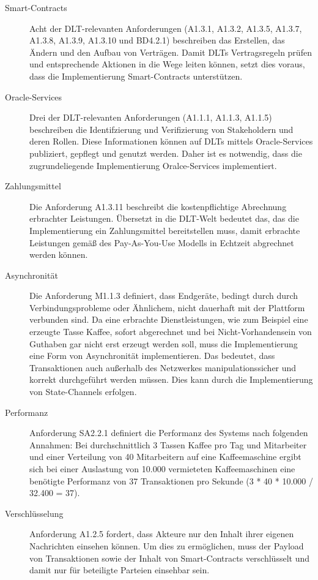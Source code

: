 \begin{description}
  \item[Smart-Contracts] Acht der \ac{DLT}-relevanten Anforderungen (A1.3.1, A1.3.2, A1.3.5, A1.3.7, A1.3.8, A1.3.9, A1.3.10 und BD4.2.1) beschreiben das Erstellen, das Ändern und den Aufbau von Verträgen. Damit \ac{DLT}s Vertragsregeln prüfen und entsprechende Aktionen in die Wege leiten können, setzt dies voraus, dass die Implementierung Smart-Contracts unterstützen.
  \item[Oracle-Services] Drei der \ac{DLT}-relevanten Anforderungen (A1.1.1, A1.1.3, A1.1.5) beschreiben die Identifzierung und Verifizierung von Stakeholdern und deren Rollen. Diese Informationen können auf \ac{DLT}s mittels Oracle-Services publiziert, gepflegt und genutzt werden. Daher ist es notwendig, dass die zugrundeliegende Implementierung Oralce-Services implementiert.
  \item[Zahlungsmittel] Die Anforderung A1.3.11 beschreibt die kostenpflichtige Abrechnung erbrachter Leistungen. Übersetzt in die \ac{DLT}-Welt bedeutet das, das die Implementierung ein Zahlungsmittel bereitstellen muss, damit erbrachte Leistungen gemäß des Pay-As-You-Use Modells in Echtzeit abgrechnet werden können.
  \item[Asynchronität] Die Anforderung M1.1.3 definiert, dass Endgeräte, bedingt durch durch Verbindungsprobleme oder Ähnlichem, nicht dauerhaft mit der Plattform verbunden sind. Da eine erbrachte Dienstleistungen, wie zum Beispiel eine erzeugte Tasse Kaffee, sofort abgerechnet und bei Nicht-Vorhandensein von Guthaben gar nicht erst erzeugt werden soll, muss die Implementierung eine Form von Asynchronität implementieren. Das bedeutet, dass Transaktionen auch außerhalb des Netzwerkes manipulationssicher und korrekt durchgeführt werden müssen. Dies kann durch die Implementierung von State-Channels erfolgen.
  \item[Performanz] Anforderung SA2.2.1 definiert die Performanz des Systems nach folgenden Annahmen: Bei durchschnittlich 3 Tassen Kaffee pro Tag und Mitarbeiter und einer Verteilung von 40 Mitarbeitern auf eine Kaffeemaschine ergibt sich bei einer Auslastung von 10.000 vermieteten Kaffeemaschinen eine benötigte Performanz von 37 Transaktionen pro Sekunde (3 * 40 * 10.000 / 32.400 = 37).
  \item[Verschlüsselung] Anforderung A1.2.5 fordert, dass Akteure nur den Inhalt ihrer eigenen Nachrichten einsehen können. Um dies zu ermöglichen, muss der Payload von Transaktionen sowie der Inhalt von Smart-Contracts verschlüsselt und damit nur für beteiligte Parteien einsehbar sein.
\end{description}
